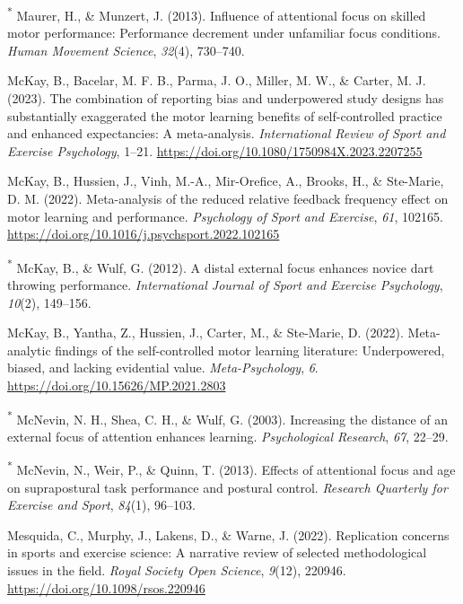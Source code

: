 \documentclass[
  man, donotrepeattitle,floatsintext]{apa7}
\newlength{\cslhangindent}
\newlength{\cslentryspacingunit} %
\newenvironment{CSLReferences}[2] %
 {%
  \setlength{\parindent}{0pt}
  \ifodd #1
  \let\oldpar\par
  \def\par{\hangindent=\cslhangindent\oldpar}
  \fi
  \setlength{\parskip}{#2\cslentryspacingunit}
 }%
 {}
\begin{document}
\begin{CSLReferences}{1}{0}
\leavevmode{}%
\textsuperscript{*} Maurer, H., \& Munzert, J. (2013). Influence of attentional focus on skilled motor performance: Performance decrement under unfamiliar focus conditions. \emph{Human Movement Science}, \emph{32}(4), 730--740.

\leavevmode{}%
McKay, B., Bacelar, M. F. B., Parma, J. O., Miller, M. W., \& Carter, M. J. (2023). The combination of reporting bias and underpowered study designs has substantially exaggerated the motor learning benefits of self-controlled practice and enhanced expectancies: A meta-analysis. \emph{International Review of Sport and Exercise Psychology}, 1--21. \url{https://doi.org/10.1080/1750984X.2023.2207255}

\leavevmode{}%
McKay, B., Hussien, J., Vinh, M.-A., Mir-Orefice, A., Brooks, H., \& Ste-Marie, D. M. (2022). Meta-analysis of the reduced relative feedback frequency effect on motor learning and performance. \emph{Psychology of Sport and Exercise}, \emph{61}, 102165. \url{https://doi.org/10.1016/j.psychsport.2022.102165}

\leavevmode{}%
\textsuperscript{*} McKay, B., \& Wulf, G. (2012). A distal external focus enhances novice dart throwing performance. \emph{International Journal of Sport and Exercise Psychology}, \emph{10}(2), 149--156.

\leavevmode{}%
McKay, B., Yantha, Z., Hussien, J., Carter, M., \& Ste-Marie, D. (2022). Meta-analytic findings of the self-controlled motor learning literature: {Underpowered}, biased, and lacking evidential value. \emph{Meta-Psychology}, \emph{6}. \url{https://doi.org/10.15626/MP.2021.2803}

\leavevmode{}%
\textsuperscript{*} McNevin, N. H., Shea, C. H., \& Wulf, G. (2003). Increasing the distance of an external focus of attention enhances learning. \emph{Psychological Research}, \emph{67}, 22--29.

\leavevmode{}%
\textsuperscript{*} McNevin, N., Weir, P., \& Quinn, T. (2013). Effects of attentional focus and age on suprapostural task performance and postural control. \emph{Research Quarterly for Exercise and Sport}, \emph{84}(1), 96--103.

\leavevmode{}%
Mesquida, C., Murphy, J., Lakens, D., \& Warne, J. (2022). Replication concerns in sports and exercise science: A narrative review of selected methodological issues in the field. \emph{Royal Society Open Science}, \emph{9}(12), 220946. \url{https://doi.org/10.1098/rsos.220946}


\end{CSLReferences}
\end{document}
